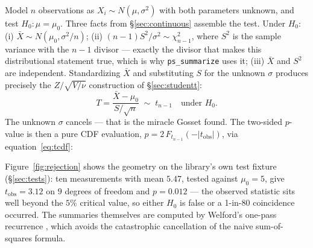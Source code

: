 \documentclass[11pt]{article}
\numberwithin{equation}{section}
\begin{document}
Model $n$ observations as $X_i \sim N(\mu,\sigma^2)$ with both parameters
unknown, and test $H_0\colon \mu=\mu_0$.  Three facts from
\S\ref{sec:continuous} assemble the test.  Under $H_0$: (i)
$\bar X \sim N(\mu_0, \sigma^2/n)$; (ii)
$(n-1)S^2/\sigma^2 \sim \chi^2_{n-1}$, where $S^2$ is the sample variance
with the $n-1$ divisor --- exactly the divisor that makes this
distributional statement true, which is why \texttt{ps\_summarize} uses
it; (iii) $\bar X$ and $S^2$ are independent.  Standardizing $\bar X$ and
substituting $S$ for the unknown $\sigma$ produces precisely the
$Z/\sqrt{V/\nu}$ construction of \S\ref{sec:studentt}:
\begin{equation}\label{eq:tstat}
T=\frac{\bar X-\mu_0}{S/\sqrt{n}} \;\sim\; t_{n-1}
\quad\text{under } H_0 .
\end{equation}
The unknown $\sigma$ cancels --- that is the miracle Gosset found.  The
two-sided $p$-value is then a pure CDF evaluation,
$p = 2\,F_{t_{n-1}}(-|t_{\text{obs}}|)$, via
equation~\eqref{eq:tcdf}:

\begin{center}
\end{center}

Figure~\ref{fig:rejection} shows the geometry on the library's own test
fixture (\S\ref{sec:tests}): ten measurements with mean $5.47$, tested
against $\mu_0=5$, give $t_{\text{obs}}=3.12$ on $9$ degrees of freedom
and $p=0.012$ --- the observed statistic sits well beyond the $5\%$
critical value, so either $H_0$ is false or a 1-in-80 coincidence
occurred.  The summaries themselves are computed by Welford's one-pass
recurrence \citep{welford1962}, which avoids the catastrophic cancellation
of the naive sum-of-squares formula.
\end{document}
